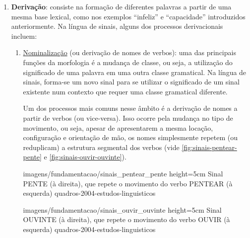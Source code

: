 \begin{enumerate}
    \item \textbf{Derivação}: consiste na formação de diferentes palavras a partir de uma mesma base lexical, como nos exemplos ``infeliz'' e ``capacidade'' introduzidos anteriormente. Na língua de sinais, alguns dos processos derivacionais incluem:
    

    \begin{enumerate}
        \item \underline{Nominalização} (ou derivação de nomes de verbos): uma das principais funções da morfologia é a mudança de classe, ou seja, a utilização do significado de uma palavra em uma outra classe gramatical.
        Na língua de sinais, forma-se um novo sinal para se utilizar o significado de um sinal existente num contexto que requer uma classe gramatical diferente. 
        
        Um dos processos mais comuns nesse âmbito é a derivação de nomes a partir de verbos (ou vice-versa). Isso ocorre pela mudança no tipo de movimento, ou seja, apesar de apresentarem a mesma locação, configuração e orientação de mão, os nomes simplesmente repetem (ou reduplicam) a estrutura segmental dos verbos (vide \autoref{fig:sinais-pentear-pente} e \autoref{fig:sinais-ouvir-ouvinte}).
        
            {imagens/fundamentacao/sinais_pentear_pente} %
            {height=5cm} %
            {Sinal PENTE (à direita), que repete o movimento do verbo PENTEAR (à esquerda)} %
            {quadros-2004-estudos-linguisticos} %
        
            {imagens/fundamentacao/sinais_ouvir_ouvinte} %
            {height=5cm} %
            {Sinal OUVINTE (à direita), que repete o movimento do verbo OUVIR (à esquerda)} %
            {quadros-2004-estudos-linguisticos} %
        



\end{enumerate}
\end{enumerate}
